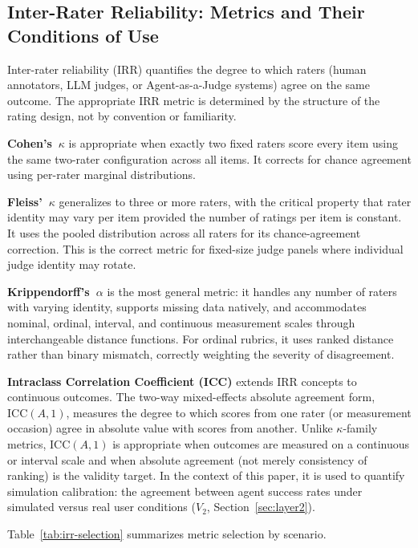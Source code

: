 \documentclass[preprint,12pt]{elsarticle}
\newcommand{\ka}{Krippendorff's~$\alpha$}
\newcommand{\fk}{Fleiss'~$\kappa$}
\newcommand{\ck}{Cohen's~$\kappa$}
\begin{document}
\subsection{Inter-Rater Reliability: Metrics and Their Conditions of Use}
\label{sec:irr-metrics}

Inter-rater reliability (IRR) quantifies the degree to which raters (human
annotators, LLM judges, or Agent-as-a-Judge systems) agree on the same outcome.
The appropriate IRR metric is determined by the structure of the rating design, not
by convention or familiarity.

\textbf{\ck} \citep{cohen1960} is appropriate when exactly two fixed raters score
every item using the same two-rater configuration across all items. It corrects for
chance agreement using per-rater marginal distributions.

\textbf{\fk} \citep{fleiss1971} generalizes to three or more raters, with the
critical property that rater identity may vary per item provided the number of
ratings per item is constant. It uses the pooled distribution across all raters for
its chance-agreement correction. This is the correct metric for fixed-size judge
panels where individual judge identity may rotate.

\textbf{\ka} \citep{krippendorff2004} is the most general metric: it handles any
number of raters with varying identity, supports missing data natively, and
accommodates nominal, ordinal, interval, and continuous measurement scales through
interchangeable distance functions. For ordinal rubrics, it uses ranked distance
rather than binary mismatch, correctly weighting the severity of disagreement.

\textbf{Intraclass Correlation Coefficient (ICC)} extends IRR concepts to
continuous outcomes. The two-way mixed-effects absolute agreement form,
$\text{ICC}(A,1)$, measures the degree to which scores from one rater (or
measurement occasion) agree in absolute value with scores from another. Unlike
$\kappa$-family metrics, $\text{ICC}(A,1)$ is appropriate when outcomes are
measured on a continuous or interval scale and when absolute agreement (not merely
consistency of ranking) is the validity target. In the context of this paper, it
is used to quantify simulation calibration: the agreement between agent success
rates under simulated versus real user conditions ($V_2$, Section~\ref{sec:layer2}).

Table~\ref{tab:irr-selection} summarizes metric selection by scenario.
\end{document}
